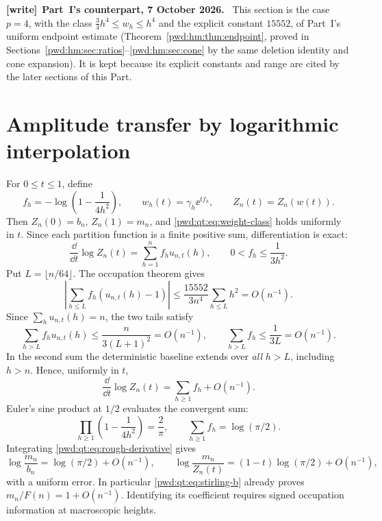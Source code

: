 \documentclass[11pt,letterpaper]{article}
\numberwithin{equation}{section}
\theoremstyle{remark}\newtheorem{remark}[theorem]{Remark}
\newenvironment{writenote}[1][]{\par\smallskip\begingroup\small
 \noindent\textbf{[write]}\if\relax\detokenize{#1}\relax\else~\textbf{#1.}\fi\ }%
 {\par\endgroup\smallskip}
\begin{document}
\begin{writenote}[Part~I's counterpart, 7 October 2026]
This section is the case $p=4$, with the class $\frac34h^4\le w_h\le h^4$ and
the explicit constant $15552$, of Part~I's uniform endpoint estimate
(Theorem~\ref{pwd:hm:thm:endpoint}, proved in
Sections~\ref{pwd:hm:sec:ratios}--\ref{pwd:hm:sec:cone} by the same deletion
identity and cone expansion). It is kept because its explicit constants and
range are cited by the later sections of this Part.
\end{writenote}

\section{Amplitude transfer by logarithmic interpolation}\label{pwd:qt:sec:amplitude}
For $0\le t\le1$, define
\begin{equation}\label{pwd:qt:eq:interpolation}
 f_h=-\log\left(1-\frac1{4h^2}\right),\qquad
 w_h(t)=\gamma_h\ee^{tf_h},\qquad Z_n(t)=Z_n(w(t)).
\end{equation}
Then $Z_n(0)=b_n$, $Z_n(1)=m_n$, and \eqref{pwd:qt:eq:weight-class} holds uniformly in $t$. Since each partition function is a finite positive sum, differentiation is exact:
\begin{equation}\label{pwd:qt:eq:logderivative}
 \frac{\dd}{\dd t}\log Z_n(t)=\sum_{h=1}^nf_hu_{n,t}(h),
 \qquad 0<f_h\le\frac1{3h^2}.
\end{equation}
Put $L=\lfloor n/64\rfloor$. The occupation theorem gives
\[
 \left|\sum_{h\le L}f_h(u_{n,t}(h)-1)\right|
 \le\frac{15552}{3n^4}\sum_{h\le L}h^2=O(n^{-1}).
\]
Since $\sum_hu_{n,t}(h)=n$, the two tails satisfy
\[
 \sum_{h>L}f_hu_{n,t}(h)\le\frac{n}{3(L+1)^2}=O(n^{-1}),
 \qquad \sum_{h>L}f_h\le\frac1{3L}=O(n^{-1}).
\]
In the second sum the deterministic baseline extends over \emph{all} $h>L$, including $h>n$. Hence, uniformly in $t$,
\begin{equation}\label{pwd:qt:eq:rough-derivative}
 \frac{\dd}{\dd t}\log Z_n(t)=\sum_{h\ge1}f_h+O(n^{-1}).
\end{equation}
Euler's sine product at $1/2$ evaluates the convergent sum:
\begin{equation}\label{pwd:qt:eq:euler}
 \prod_{h\ge1}\left(1-\frac1{4h^2}\right)=\frac2\pi,
 \qquad \sum_{h\ge1}f_h=\log(\pi/2).
\end{equation}
Integrating \eqref{pwd:qt:eq:rough-derivative} gives
\begin{equation}\label{pwd:qt:eq:rough-comparison}
 \log\frac{m_n}{b_n}=\log(\pi/2)+O(n^{-1}),\qquad
 \log\frac{m_n}{Z_n(t)}=(1-t)\log(\pi/2)+O(n^{-1}),
\end{equation}
with a uniform error. In particular \eqref{pwd:qt:eq:stirling-b} already proves $m_n/F(n)=1+O(n^{-1})$. Identifying its coefficient requires signed occupation information at macroscopic heights.
\end{document}
